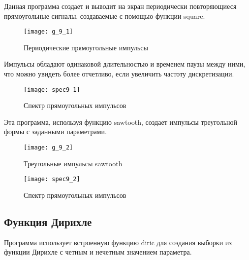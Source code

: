 
\parindent=1cm
Данная программа создает и выводит на экран периодически повторяющиеся прямоугольные сигналы, создаваемые с помощью функции square.

\begin{figure}[H]
	\begin{center}
		\texttt{[image: g\_9\_1]}
		\caption{Периодические прямоугольные импульсы} 
		\label{pic:g_9_1} %
	\end{center}
\end{figure}
Импульсы обладают одинаковой длительностью и временем паузы между ними, что можно увидеть более отчетливо, если увеличить частоту дискретизации.
\begin{figure}[H]
	\begin{center}
		\texttt{[image: spec9\_1]}
		\caption{Спектр прямоугольных импульсов} 
		\label{pic:spec9_1} %
	\end{center}
\end{figure}


\parindent=1cm
Эта программа, используя функцию sawtooth, создает импульсы треугольной формы с заданными параметрами.

\begin{figure}[H]
	\begin{center}
		\texttt{[image: g\_9\_2]}
		\caption{Треугольные импульсы sawtooth} 
		\label{pic:g_9_2} %
	\end{center}
\end{figure}
\begin{figure}[H]
	\begin{center}
		\texttt{[image: spec9\_2]}
		\caption{Спектр прямоугольных импульсов} 
		\label{pic:spec9_2} %
	\end{center}
\end{figure}

\subsection{Функция Дирихле}


\parindent=1cm
Программа использует встроенную функцию diric для создания выборки из функции Дирихле с четным и нечетным значением параметра.


